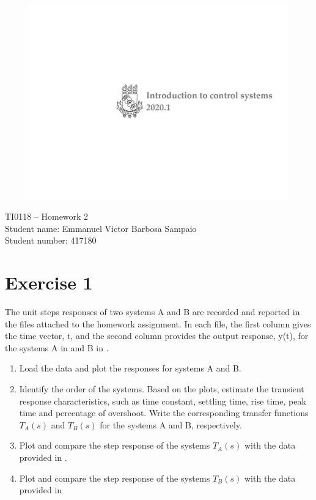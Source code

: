 \documentclass[a4paper]{article}
\begin{document}
\begin{figure}[!h] \includegraphics [scale=0.35] {Figures/FromMichela/Course-logo-long} \end{figure}

\begin{spacing}{1.5}
{\Large\sc \noindent TI0118 -- Homework 2} \\

{\large\sc \noindent Student name: Emmanuel Victor Barbosa Sampaio}\\
{\large\sc \noindent Student number: 417180 }
\end{spacing}
\vskip1cm

\section*{Exercise 1}
The unit steps responses of two systems A and B are recorded and reported in the
files attached to the homework assignment. In each file, the first column gives the time vector, t, and the second column provides the output response, y(t), for the systems A in  and B in .
\begin{enumerate}
    \item Load the data and plot the responses for systems A and B.
    \item Identify the order of the systems. Based on the plots, estimate the transient response characteristics, such as time constant, settling time, rise time, peak time and percentage of overshoot. Write the corresponding transfer functions $T_A(s)$ and $T_B(s)$ for the systems A and B, respectively.
    \item Plot and compare the step response of the systems $T_A(s)$ with the data provided in .
    \item Plot and compare the step response of the systems $T_B(s)$ with the data provided in 
\end{enumerate}
\end{document}
